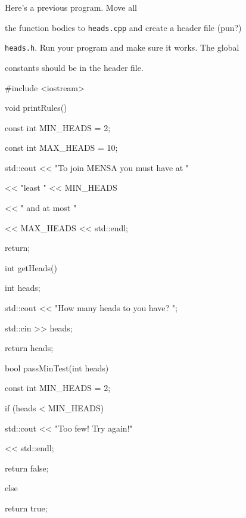 Here's a previous program. Move all

the function bodies to \texttt{heads.cpp} and create a header file (pun?)

\texttt{heads.h}. Run your program and make sure it works. The global

constants should be in the header file.

\begin{consolethree}[escapeinside=||]

#include <iostream>



void printRules()

{

    const int MIN_HEADS = 2;

    const int MAX_HEADS = 10;

    std::cout << "To join MENSA you must have at "

              << "least " << MIN_HEADS

              << " and at most "

              << MAX_HEADS << std::endl;

    return;

}



int getHeads()

{

    int heads;

    std::cout << "How many heads to you have? ";

    std::cin >> heads;

    return heads;

}



bool passMinTest(int heads)

{

    const int MIN_HEADS = 2;

    if (heads < MIN_HEADS)

    {

        std::cout << "Too few! Try again!"

                  << std::endl;

        return false;

    }

    else

        return true;

}




\end{consolethree}
